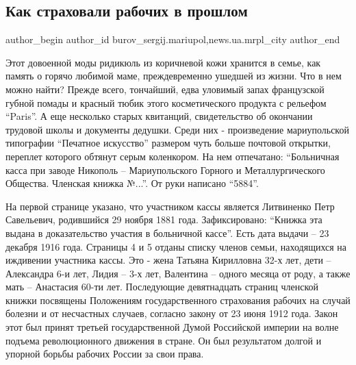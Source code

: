 
 
 
 
 
 
\subsection{Как страховали рабочих в прошлом}
\label{sec:14_05_2017.stz.news.ua.mrpl_city.1.kak_strahovali_rabochih_v_proshlom}
 
\ifcmt
 author_begin
   author_id burov_sergij.mariupol,news.ua.mrpl_city
 author_end
\fi

Этот довоенной моды ридикюль из коричневой кожи хранится в семье, как память о
горячо любимой маме, преждевременно ушедшей из жизни. Что в нем можно найти?
Прежде всего, тончайший, едва уловимый запах французской губной помады и
красный тюбик этого косметического продукта с рельефом \enquote{Paris}. А еще несколько
старых квитанций, свидетельство об окончании трудовой школы и документы
дедушки. Среди них - произведение мариупольской типографии \enquote{Печатное искусство}
размером чуть больше почтовой открытки, переплет которого обтянут серым
коленкором. На нем отпечатано: \enquote{Больничная касса при заводе Никополь –
Мариупольского Горного и Металлургического Общества. Членская книжка №...}. От
руки написано \enquote{5884}.

На первой странице указано, что участником кассы является Литвиненко Петр
Савельевич, родившийся 29 ноября 1881 года. Зафиксировано: \enquote{Книжка эта выдана в
доказательство участия в больничной кассе}. Есть дата выдачи – 23 декабря 1916
года. Страницы 4 и 5 отданы списку членов семьи, находящихся на иждивении
участника кассы. Это - жена Татьяна Кирилловна 32-х лет, дети – Александра 6-и
лет, Лидия – 3-х лет, Валентина – одного месяца от роду, а также мать –
Анастасия 60-ти лет. Последующие девятнадцать страниц членской книжки посвящены
Положениям государственного страхования рабочих на случай болезни и от
несчастных случаев, согласно закону от 23 июня 1912 года. Закон этот был принят
третьей государственной Думой Российской империи на волне подъема
революционного движения в стране. Он был результатом долгой и упорной борьбы
рабочих России за свои права.

